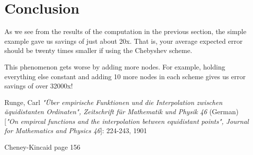 \documentclass[]{article}
\theoremstyle{plain}
\theoremstyle{definition}
\begin{document}
\section{Conclusion}

As we see from the results of the computation in the previous section, the simple example gave us savings of just about 20x. That is, your average expected error should be twenty times smaller if using the Chebyshev scheme. 

This phenomenon gets worse by adding more nodes. For example, holding everything else constant and adding 10 more nodes in each scheme gives us error savings of over 32000x!

\begin{thebibliography}{9}
Runge, Carl 
\textit{"{\"U}ber empirische Funktionen und die Interpolation zwischen \"aquidistanten Ordinaten", Zeitschrift f{\"u}r Mathematik und Physik 46} (German) [\textit{"On empircal functions and the interpolation between equidistant points", Journal for Mathematics and Physics 46}]: 224-243, 1901

Cheney-Kincaid page 156
\end{thebibliography}
\end{document}
